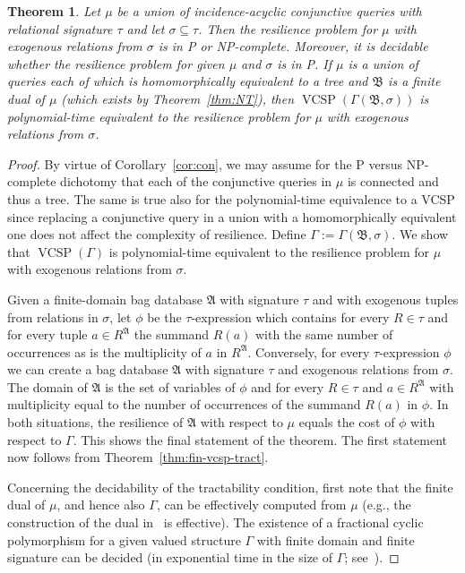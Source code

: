 \documentclass[nonacm]{acmart}
\newcommand{\bA}{{\mathfrak A}}
\newcommand{\bB}{{\mathfrak B}}
\DeclareMathOperator{\VCSP}{VCSP}
\newtheorem{theorem}{Theorem}[section]
\begin{document}
\begin{theorem}\label{thm:fin-dual} 
Let $\mu$ be
a union of incidence-acyclic conjunctive queries
with relational signature $\tau$ and let $\sigma \subseteq \tau$. Then the resilience problem for $\mu$ with exogenous relations from $\sigma$ is in P or NP-complete. Moreover, it is decidable whether the resilience problem for given $\mu$ and $\sigma$ 
is in P. 
If $\mu$ is
a union of queries each of which is
homomorphically equivalent to a tree
and $\bB$ is a finite dual of $\mu$ (which exists by Theorem~\ref{thm:NT}), then $\VCSP(\Gamma(\bB,\sigma))$ is polynomial-time equivalent to the resilience problem for $\mu$ with exogenous relations from $\sigma$.
\end{theorem}
\begin{proof}
By virtue of Corollary~\ref{cor:con}, we may assume for the P versus NP-complete dichotomy that each of the
conjunctive queries in $\mu$ is connected and thus a tree. The same
is true also for the polynomial-time equivalence to a VCSP  since replacing a conjunctive query in a union with a homomorphically equivalent one does not affect the complexity of resilience. 
Define $\Gamma := \Gamma(\bB, \sigma)$.
We show that $\VCSP(\Gamma)$ is polynomial-time equivalent to the resilience problem for $\mu$ with exogenous relations from $\sigma$. 

Given a finite-domain bag database $\bA$ with signature $\tau$ and
with exogenous tuples from relations in $\sigma$,
let $\phi$ be the $\tau$-expression which contains for every $R\in \tau$ and for every tuple $a \in R^{\bA}$ the summand $R(a)$ with the same number of occurrences as is the multiplicity of $a$ in $R^{\bA}$.
Conversely, for every $\tau$-expression $\phi$ 
we can create a bag database $\bA$ with signature $\tau$ and exogenous relations from $\sigma$. The domain of $\bA$ is the set of variables of $\phi$ and for every $R \in \tau$ and 
$a \in R^{\bA}$ with multiplicity equal to the number of occurrences of the summand $R(a)$ in $\phi$. 
In both situations, the resilience of $\bA$ with respect to $\mu$ equals the cost of $\phi$ with respect to $\Gamma$.
This shows the final statement of the theorem. The first statement now follows from
Theorem~\ref{thm:fin-vcsp-tract}. 

Concerning the decidability of the tractability condition, first note that the finite dual of $\mu$, and hence also $\Gamma$, can be effectively computed from $\mu$ (e.g., the construction of the dual in~\cite{NesetrilTardif} is effective).
The existence of a fractional cyclic polymorphism for a given valued structure $\Gamma$ with finite domain and finite signature can be decided (in exponential time in the size of $\Gamma$; see~\cite{Kolmogorov-Meta}).
\end{proof}
\end{document}
